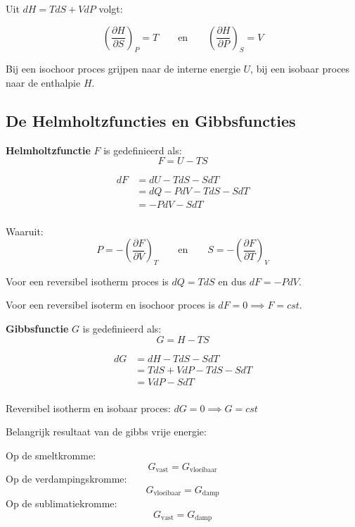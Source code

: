 Uit \(dH = TdS + VdP\) volgt:

\[\left(\frac{\partial H}{\partial S}\right)_P = T  \qquad\text{en}\qquad   \left(\frac{\partial H}{\partial P}\right)_S = V\]


Bij een isochoor proces grijpen naar de interne energie \(U\), bij een isobaar proces naar de enthalpie \(H\).

\subsection{De Helmholtzfuncties en Gibbsfuncties}

\begin{definition}
\textbf{Helmholtzfunctie} \(F\) is gedefinieerd als:
\[
F = U - TS
\]
\end{definition}

\begin{align*}
dF &= dU - TdS - SdT \\
&= dQ -PdV - TdS - SdT \\
&= -PdV-SdT \\
\end{align*}

Waaruit:
\[P =-\left(\frac{\partial F}{\partial V}\right)_T \qquad\text{en}\qquad S = -\left(\frac{\partial F}{\partial T}\right)_V \]

Voor een reversibel isotherm proces is \(dQ = TdS\) en dus \(dF = -PdV\).

Voor een reversibel isoterm en isochoor proces is \(dF = 0 \implies F = cst\).


\begin{definition}
\textbf{Gibbsfunctie} \(G\) is gedefinieerd als:
\[
G = H - TS
\]
\end{definition}

\begin{align*}
dG &= dH - TdS - SdT \\
&= TdS + VdP - TdS - SdT \\
&= VdP - SdT \\
\end{align*}

Reversibel isotherm en isobaar proces: \(dG = 0 \implies G = cst\)

Belangrijk resultaat van de gibbs vrije energie:

Op de smeltkromme:
\[G_{\text{vast}} = G_{\text{vloeibaar}} \]
Op de verdampingskromme:
\[G_{\text{vloeibaar}} = G_{\text{damp}} \]
Op de sublimatiekromme:
\[G_{\text{vast}} = G_{\text{damp}} \]
